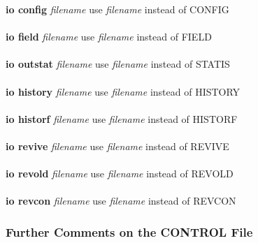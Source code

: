 \begin{tabbing}
\> {\bf io config}  {\it filename}              \> use {\it filename} instead of CONFIG \\
\>                                              \> \\
\> {\bf io field}   {\it filename}              \> use {\it filename} instead of FIELD \\
\>                                              \> \\
\> {\bf io outstat} {\it filename}              \> use {\it filename} instead of STATIS \\
\>                                              \> \\
\> {\bf io history} {\it filename}              \> use {\it filename} instead of HISTORY \\
\>                                              \> \\
\> {\bf io historf} {\it filename}              \> use {\it filename} instead of HISTORF \\
\>                                              \> \\
\> {\bf io revive}  {\it filename}              \> use {\it filename} instead of REVIVE \\
\>                                              \> \\
\> {\bf io revold}  {\it filename}              \> use {\it filename} instead of REVOLD \\
\>                                              \> \\
\> {\bf io revcon}  {\it filename}              \> use {\it filename} instead of REVCON
\end{tabbing}

\subsubsection{Further Comments on the CONTROL File}

